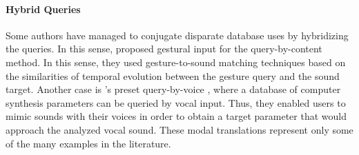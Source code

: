 {	\paragraph{Hybrid Queries}
	Some authors have managed to conjugate disparate database uses by hybridizing the queries. In this sense, \citeauthor{Caramiaux2011} \parencite{Caramiaux2011} proposed gestural input for the query-by-content method. In this sense, they used gesture-to-sound matching techniques based on the similarities of temporal evolution between the gesture query and the sound target. Another case is \citeauthor{mcartwright:2014}'s preset query-by-voice \parencite{mcartwright:2014}, where a database of computer synthesis parameters can be queried by vocal input. Thus, they enabled users to mimic sounds with their voices in order to obtain a target parameter that would approach the analyzed vocal sound. These modal translations represent only some of the many examples in the literature.
}
